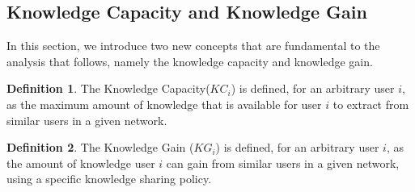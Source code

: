 \documentclass[conference]{IEEEtran}
\theoremstyle{definition}
\newtheorem{defn}{Definition}[section]
\begin{document}
%
%
\vspace{-0.5 cm}
\subsection{Knowledge Capacity and Knowledge Gain}
\vspace{-0.2 cm}
In this section, we introduce two new concepts that are fundamental to the analysis that follows, namely the knowledge capacity and knowledge gain.

\begin{defn}
The Knowledge Capacity($KC_i$) is defined, for an arbitrary user $i$, as the maximum amount of knowledge that is available for user $i$ to extract from similar users in a given network.
\end{defn}

\begin{defn}
The Knowledge Gain ($KG_i$) is defined, for an arbitrary user $i$, as the amount of knowledge user $i$ can gain from similar users in a given network, using a specific knowledge sharing policy.
\end{defn}
\end{document}
